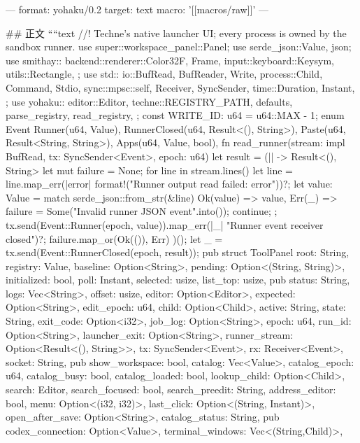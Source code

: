 ---
format: yohaku/0.2
target: text
macro: '[[macros/raw]]'
---

## 正文
````text
//! Techne's native launcher UI; every process is owned by the sandbox runner.
use super::workspace_panel::Panel;
use serde_json::{Value, json};
use smithay::{
    backend::renderer::{Color32F, Frame},
    input::keyboard::Keysym,
    utils::Rectangle,
};
use std::{
    io::{BufRead, BufReader, Write},
    process::{Child, Command, Stdio},
    sync::mpsc::{self, Receiver, SyncSender},
    time::{Duration, Instant},
};
use yohaku::{
    editor::Editor,
    techne::{REGISTRY_PATH, defaults, parse_registry, read_registry},
};
const WRITE_ID: u64 = u64::MAX - 1;
enum Event {
    Runner(u64, Value),
    RunnerClosed(u64, Result<(), String>),
    Paste(u64, Result<String, String>),
    Apps(u64, Value, bool),
}
fn read_runner(stream: impl BufRead, tx: SyncSender<Event>, epoch: u64) {
    let result = (|| -> Result<(), String> {
        let mut failure = None;
        for line in stream.lines() {
            let line = line.map_err(|error| format!("Runner output read failed: {error}"))?;
            let value: Value = match serde_json::from_str(&line) {
                Ok(value) => value,
                Err(_) => {
                    failure = Some("Invalid runner JSON event".into());
                    continue;
                }
            };
            tx.send(Event::Runner(epoch, value)).map_err(|_| "Runner event receiver closed")?;
        }
        failure.map_or(Ok(()), Err)
    })();
    let _ = tx.send(Event::RunnerClosed(epoch, result));
}
pub struct ToolPanel {
    root: String,
    registry: Value,
    baseline: Option<String>,
    pending: Option<(String, String)>,
    initialized: bool,
    poll: Instant,
    selected: usize,
    list_top: usize,
    pub status: String,
    logs: Vec<String>,
    offset: usize,
    editor: Option<Editor>,
    expected: Option<String>,
    edit_epoch: u64,
    child: Option<Child>,
    active: String,
    state: String,
    exit_code: Option<i32>,
    job_log: Option<String>,
    epoch: u64,
    run_id: Option<String>,
    launcher_exit: Option<String>,
    runner_stream: Option<Result<(), String>>,
    tx: SyncSender<Event>,
    rx: Receiver<Event>,
    socket: String,
    pub show_workspace: bool,
    catalog: Vec<Value>,
    catalog_epoch: u64,
    catalog_busy: bool,
    catalog_loaded: bool,
    lookup_child: Option<Child>,
    search: Editor,
    search_focused: bool,
    search_preedit: String,
    address_editor: bool,
    menu: Option<(i32, i32)>,
    last_click: Option<(String, Instant)>,
    open_after_save: Option<String>,
    catalog_status: String,
    pub codex_connection: Option<Value>,
    terminal_windows: Vec<(String,Child)>,
}

